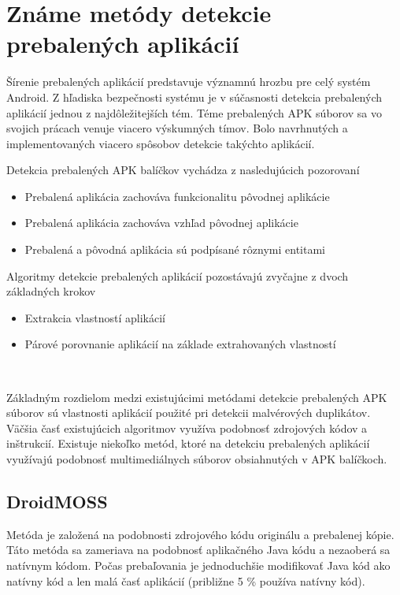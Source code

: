 \chapter{Známe metódy detekcie prebalených aplikácií}
Šírenie prebalených aplikácií predstavuje významnú hrozbu pre celý systém Android. Z hľadiska bezpečnosti systému je v súčasnosti detekcia prebalených aplikácií jednou z najdôležitejších tém.
Téme prebalených APK súborov sa vo svojich prácach venuje viacero výskumných tímov. Bolo navrhnutých a implementovaných viacero spôsobov detekcie takýchto aplikácií. 
\newline 

\noindent Detekcia prebalených APK balíčkov vychádza z nasledujúcich pozorovaní
\begin{itemize}
	\item Prebalená aplikácia zachováva funkcionalitu pôvodnej aplikácie
	\item Prebalená aplikácia zachováva vzhľad pôvodnej aplikácie
	\item Prebalená a pôvodná aplikácia sú podpísané rôznymi entitami
\end{itemize} 

\noindent Algoritmy detekcie prebalených aplikácií pozostávajú zvyčajne z dvoch základných krokov
\begin{itemize}
	\item Extrakcia vlastností aplikácií
	\item Párové porovnanie aplikácií na základe extrahovaných vlastností
\end{itemize}
\ \newline

\noindent Základným rozdielom medzi existujúcimi metódami detekcie prebalených APK súborov sú vlastnosti aplikácií použité pri detekcii malvérových duplikátov. Väčšia časť existujúcich algoritmov využíva podobnosť zdrojových kódov a inštrukcií. Existuje niekoľko metód, ktoré na detekciu prebalených aplikácií využívajú podobnosť multimediálnych súborov obsiahnutých v APK balíčkoch.

\section{DroidMOSS}
Metóda  je založená na podobnosti zdrojového kódu originálu a prebalenej kópie. Táto metóda sa zameriava na podobnosť aplikačného Java kódu a nezaoberá sa natívnym kódom. Počas prebaľovania je jednoduchšie modifikovať Java kód ako natívny kód a len malá časť aplikácií (približne 5 \% používa natívny kód).


